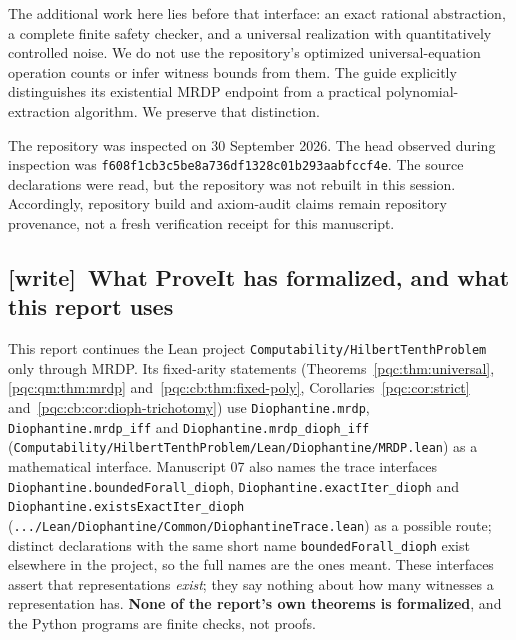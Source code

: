 \documentclass[11pt,letterpaper]{article}
\numberwithin{equation}{section}
\theoremstyle{definition}
\theoremstyle{remark}
\newcommand{\code}[1]{\nolinkurl{#1}}
\newcommand{\wtag}{\textup{[write]}}
\newcommand{\snapshot}{\texttt{f608f1cb3c5be8a736df1328c01b293aabfccf4e}}
\newcommand{\headsha}{\snapshot}
\begin{document}
The additional work here lies before that interface: an exact rational
abstraction, a complete finite safety checker, and a universal realization
with quantitatively controlled noise.  We do not use the repository's
optimized universal-equation operation counts or infer witness bounds from
them.  The guide explicitly distinguishes its existential MRDP endpoint from
a practical polynomial-extraction algorithm.  We preserve that distinction.

The repository was inspected on 30 September 2026.  The head observed during
inspection was \headsha.  The source declarations were read, but the repository
was not rebuilt in this session.  Accordingly, repository build and axiom-audit
claims remain repository provenance, not a fresh verification receipt for this
manuscript.

\subsection{\wtag\ What ProveIt has formalized, and what this report uses}
\label{pqc:conv:formal}
This report continues the Lean project \code{Computability/HilbertTenthProblem}
only through MRDP. Its fixed-arity statements
(Theorems~\ref{pqc:thm:universal}, \ref{pqc:qm:thm:mrdp}
and~\ref{pqc:cb:thm:fixed-poly}, Corollaries~\ref{pqc:cor:strict}
and~\ref{pqc:cb:cor:dioph-trichotomy}) use \code{Diophantine.mrdp},
\code{Diophantine.mrdp_iff} and \code{Diophantine.mrdp_dioph_iff}
(\code{Computability/HilbertTenthProblem/Lean/Diophantine/MRDP.lean}) as a
mathematical interface. Manuscript 07 also names the trace interfaces
\code{Diophantine.boundedForall_dioph}, \code{Diophantine.exactIter_dioph}
and \code{Diophantine.existsExactIter_dioph}
(\code{.../Lean/Diophantine/Common/DiophantineTrace.lean}) as a possible
route; distinct declarations with the same short name
\code{boundedForall_dioph} exist elsewhere in the project, so the full names
are the ones meant. These interfaces assert that representations
\emph{exist}; they say nothing about how many witnesses a representation has.
\textbf{None of the report's own theorems is formalized}, and the Python
programs are finite checks, not proofs.
\end{document}
